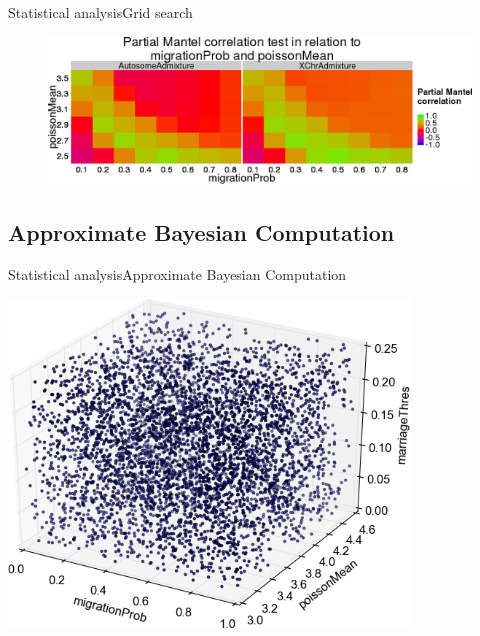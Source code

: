 \documentclass[10pt, aspectratio=43]{beamer}
\begin{document}
\begin{frame}{Statistical analysis}{Grid search}
\begin{center}
  \begin{figure}
    \includegraphics[width=1\textwidth]{../data/sensit-comp-2d-preview.png}
  \end{figure}
\end{center}
\end{frame}

\subsection{Approximate Bayesian Computation}
\begin{frame}{Statistical analysis}{Approximate Bayesian Computation}
\begin{center}
  \includegraphics[width=0.8\textwidth]{../data/abc-space.png}
\end{center}
\end{frame}
\end{document}
